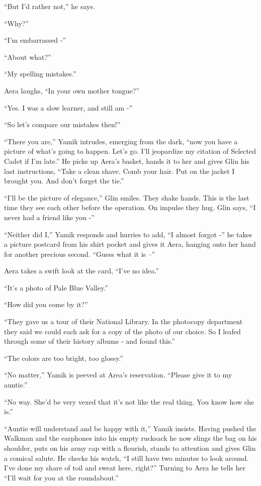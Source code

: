 \documentclass[twoside,11pt]{book}
\begin{document}
``But I'd rather not,'' he says.

``Why?''

``I'm embarrassed -''

``About what?''

``My spelling mistakes.''

Aera laughs, ``In your own mother tongue?''

``Yes. I was a slow learner, and still am -''

``So let's compare our mistakes then!''

``There you are,'' Yamik intrudes, emerging from the dark, ``now you have a picture of
what's going to happen. Let's go. I'll jeopardize my citation of Selected Cadet if I'm late.'' He picks
up Aera's basket, hands it to her and gives Glin his last instructions, ``Take a clean shave. Comb your
hair. Put on the jacket I brought you. And don't forget the tie.''

``I'll be the picture of elegance,'' Glin smiles. They shake hands. This is the last time they
see each other before the operation. On impulse they hug. Glin says, ``I never had a friend like you
-''

``Neither did I,'' Yamik responds and hurries to add, ``I almost forgot
-'' he takes a picture postcard from his shirt pocket and gives it Aera, hanging onto her hand for another
precious second. ``Guess what it is --''

Aera takes a swift look at the card, ``I've no idea.''

``It's a photo of Pale Blue Valley.''

``How did you come by it?''

``They gave us a tour of their National Library. In the photocopy department they said we could each ask
for a copy of the photo of our choice. So I leafed through some of their history albums - and found
this.''

``The colors are too bright, too glossy.''

``No matter,'' Yamik is peeved at Area's reservation. ``Please give it to my
auntie.''

``No way. She'd be very vexed that it's not like the real thing. You know how she is.''

``Auntie will understand and be happy with it,'' Yamik insists. Having pushed the Walkman and
the earphones into his empty rucksack he now slings the bag on his shoulder, puts on his army cap with a flourish,
stands to attention and gives Glin a comical salute. He checks his watch, ``I still have two minutes to
look around. I've done my share of toil and sweat here, right?'' Turning to Aera he tells her ``I'll wait
for you at the roundabout.''
\end{document}
